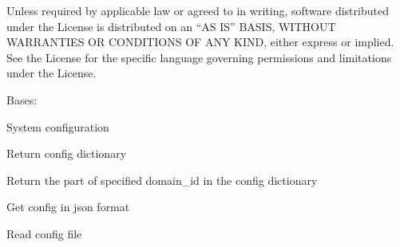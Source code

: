 \documentclass[letterpaper,10pt,english]{sphinxmanual}
\begin{document}
Unless required by applicable law or agreed to in writing, software
distributed under the License is distributed on an “AS IS” BASIS,
WITHOUT WARRANTIES OR CONDITIONS OF ANY KIND, either express or implied.
See the License for the specific language governing permissions and
limitations under the License.

\begin{fulllineitems}
\label{\detokenize{bbc1.core.bbc_config:bbc1.core.bbc_config.BBcConfig}}
Bases: 

System configuration

\begin{fulllineitems}
\label{\detokenize{bbc1.core.bbc_config:bbc1.core.bbc_config.BBcConfig.get_config}}
Return config dictionary

\end{fulllineitems}


\begin{fulllineitems}
\label{\detokenize{bbc1.core.bbc_config:bbc1.core.bbc_config.BBcConfig.get_domain_config}}
Return the part of specified domain\_id in the config dictionary

\end{fulllineitems}


\begin{fulllineitems}
\label{\detokenize{bbc1.core.bbc_config:bbc1.core.bbc_config.BBcConfig.get_json_config}}
Get config in json format

\end{fulllineitems}


\begin{fulllineitems}
\label{\detokenize{bbc1.core.bbc_config:bbc1.core.bbc_config.BBcConfig.read_config}}
Read config file


\end{fulllineitems}
\end{fulllineitems}
\end{document}
